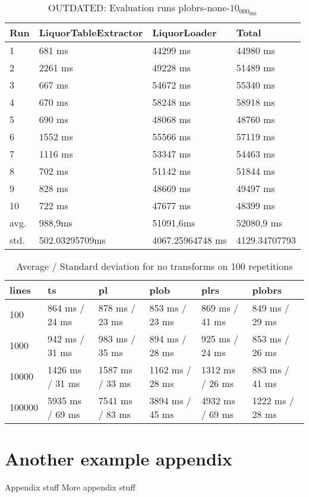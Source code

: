 \begin{table}[ht]
	\caption{OUTDATED: Evaluation runs plobrs-none-$10_000_000$}
	\label{tab:eval:plobrs-none-10_000_000}
	\begin{tabular}{|l|l|l|l|}
		\hline
		Run  & LiquorTableExtractor & LiquorLoader     & Total         \\
		\hline
		1    & 681 ms               & 44299 ms         & 44980 ms      \\
		2    & 2261 ms              & 49228 ms         & 51489 ms      \\
		3    & 667 ms               & 54672 ms         & 55340 ms      \\
		4    & 670 ms               & 58248 ms         & 58918 ms      \\
		5    & 690 ms               & 48068 ms         & 48760 ms      \\
		6    & 1552 ms              & 55566 ms         & 57119 ms      \\
		7    & 1116 ms              & 53347 ms         & 54463 ms      \\
		8    & 702 ms               & 51142 ms         & 51844 ms      \\
		9    & 828 ms               & 48669 ms         & 49497 ms      \\
		10   & 722 ms               & 47677 ms         & 48399 ms      \\
		\hline
		avg. & 988,9ms              & 51091,6ms        & 52080,9 ms    \\
		std. & 502.03295709ms       & 4067.25964748 ms & 4129.34707793 \\
		\hline
	\end{tabular}
\end{table}
\begin{table}[ht]
	\caption{Average / Standard deviation for no transforms on 100 repetitions}
	\label{tab:eval:none}
	\begin{tabular}{|l|l|l|l|l|l|}
		\hline
		lines  & ts              & pl              & plob            & plrs            & plobrs          \\
		\hline
		100    & 864 ms / 24 ms  & 878 ms / 23 ms  & 853 ms / 23 ms  & 869 ms / 41 ms  & 849 ms / 29 ms  \\
		1000   & 942 ms / 31 ms  & 983 ms / 35 ms  & 894 ms / 28 ms  & 925 ms / 24 ms  & 853 ms / 26 ms  \\
		10000  & 1426 ms / 31 ms & 1587 ms / 33 ms & 1162 ms / 28 ms & 1312 ms / 26 ms & 883 ms / 41 ms  \\
		100000 & 5935 ms / 69 ms & 7541 ms / 83 ms & 3894 ms / 45 ms & 4932 ms / 69 ms & 1222 ms / 28 ms \\
		\hline
	\end{tabular}
\end{table}






\pagebreak
\section{Another example appendix}
\label{appendix:example2}
\newpage
Appendix stuff
\newpage
More appendix stuff
